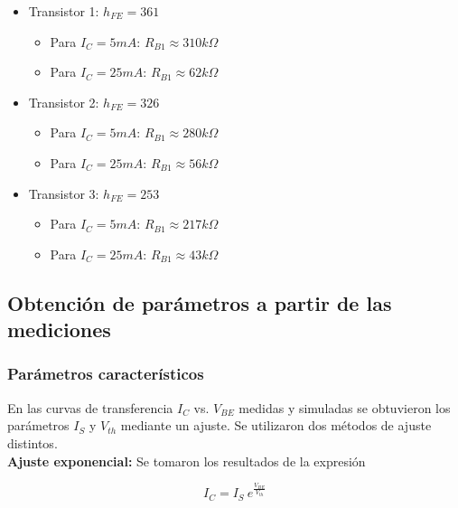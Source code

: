 \documentclass[10pt,spanish,a4paper,openany,notitlepage]{article}
\begin{document}
\begin{itemize}

\item{Transistor 1:} $h_{FE} = 361$

\begin{itemize}
\item{Para $I_C = 5 \unit{mA}$}: $R_{B1} \approx 310 \unit{k\Omega}$
\item{Para $I_C = 25 \unit{mA}$}: $R_{B1} \approx  62\unit{k\Omega}$
\end{itemize}

\item{Transistor 2:} $h_{FE} = 326$

\begin{itemize}
\item{Para $I_C = 5 \unit{mA}$}: $R_{B1} \approx  280\unit{k\Omega}$
\item{Para $I_C = 25 \unit{mA}$}: $R_{B1} \approx  56\unit{k\Omega}$
\end{itemize}

\item{Transistor 3:} $h_{FE} = 253$

\begin{itemize}
\item{Para $I_C = 5 \unit{mA}$}: $R_{B1} \approx  217\unit{k\Omega}$
\item{Para $I_C = 25 \unit{mA}$}: $R_{B1} \approx  43\unit{k\Omega}$
\end{itemize}

\end{itemize}

\subsection{Obtención de parámetros a partir de las mediciones}

\subsubsection{Parámetros característicos}

En las curvas de transferencia $I_C$ vs. $V_{BE}$ medidas y simuladas se obtuvieron los parámetros $I_S$ y $V_{th}$ mediante un ajuste. Se utilizaron dos métodos de ajuste distintos.\\

\textbf{Ajuste exponencial:} Se tomaron los resultados de la expresión

\[ \displaystyle I_C  = I_S\ e^{\frac{V_{BE}}{V_{th}}} \]
\end{document}

